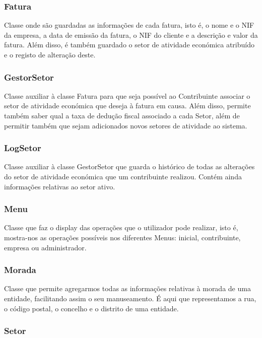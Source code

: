 \documentclass[a4paper]{article}
\begin{document}
\subsubsection{Fatura} %

Classe onde são guardadas as informações de cada fatura, isto é, o nome e o NIF da empresa, a data de emissão da fatura, o NIF do cliente e a descrição e valor da fatura. Além disso, é também guardado o setor de atividade económica atribuído e o registo de alteração deste. 


\subsubsection{GestorSetor} %

Classe auxiliar à classe Fatura para que seja possível ao Contribuinte associar o setor de atividade económica que deseja à fatura em causa. Além disso, permite também saber qual a taxa de dedução fiscal associado a cada Setor, além de permitir também que sejam adicionados novos setores de atividade ao sistema.


\subsubsection{LogSetor} %

Classe auxiliar à classe GestorSetor que guarda o histórico de todas as alterações do setor de atividade económica que um contribuinte realizou. Contém ainda informações relativas ao setor ativo.

 
\subsubsection{Menu} %

Classe que faz o display das operações que o utilizador pode realizar, isto é, mostra-nos as operações possíveis nos diferentes Menus: inicial, contribuinte, empresa ou administrador.


\subsubsection{Morada} %

Classe que permite agregarmos todas as informações relativas à morada de uma entidade, facilitando assim o seu manuseamento. É aqui que representamos a rua, o código postal, o concelho e o distrito de uma entidade.


\subsubsection{Setor} %
\end{document}
